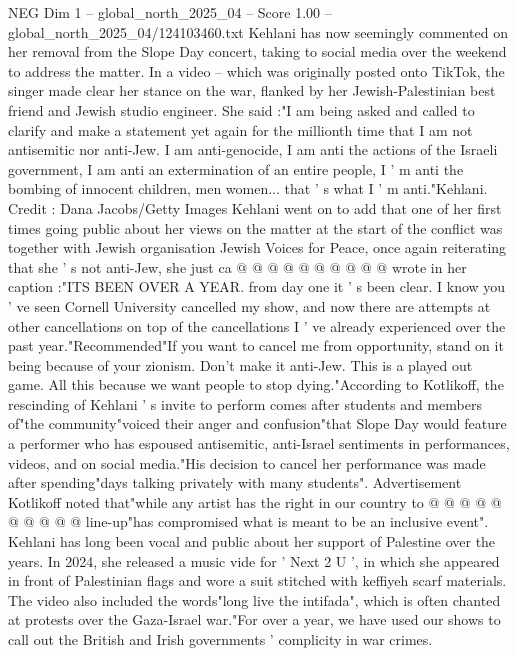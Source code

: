 \begin{textsample}{NEG Dim 1 – global\_north\_2025\_04 – Score 1.00 – global\_north\_2025\_04/124103460.txt}  \label{ex:f1_neg_108}
Kehlani has now seemingly commented on her removal from the Slope Day concert, taking to social media over the weekend to address the matter.
In a video -- which was originally posted onto TikTok, the singer made clear her stance on the war, flanked by her Jewish-Palestinian best friend and Jewish studio engineer.
She said :"I am being asked and called to clarify and make a statement yet again for the millionth time that I am not antisemitic nor anti-Jew.
I am anti-genocide, I am anti the actions of the Israeli government, I am anti an extermination of an entire people, I ' m anti the bombing of innocent children, men women... that ' s what I ' m anti."Kehlani.
Credit : Dana Jacobs/Getty Images Kehlani went on to add that one of her first times going public about her views on the matter at the start of the conflict was together with Jewish organisation Jewish Voices for Peace, once again reiterating that she ' s not anti-Jew, she just ca @ @ @ @ @ @ @ @ @ @ wrote in her caption :"ITS BEEN OVER A YEAR. from day one it ' s been clear.
I know you ' ve seen Cornell University cancelled my show, and now there are attempts at other cancellations on top of the cancellations I ' ve already experienced over the past year."Recommended"If you want to cancel me from opportunity, stand on it being because of your zionism.
Don't make it anti-Jew.
This is a played out game.
All this because we want people to stop dying."According to Kotlikoff, the rescinding of Kehlani ' s invite to perform comes after students and members of"the community"voiced their anger and confusion"that Slope Day would feature a performer who has espoused antisemitic, anti-Israel sentiments in performances, videos, and on social media."His decision to cancel her performance was made after spending"days talking privately with many students".
Advertisement Kotlikoff noted that"while any artist has the right in our country to @ @ @ @ @ @ @ @ @ @ line-up"has compromised what is meant to be an inclusive event".
Kehlani has long been vocal and public about her support of Palestine over the years.
In 2024, she released a music vide for ' Next 2 U ', in which she appeared in front of Palestinian flags and wore a suit stitched with keffiyeh scarf materials.
The video also included the words"long live the intifada", which is often chanted at protests over the Gaza-Israel war."For over a year, we have used our shows to call out the British and Irish governments ' complicity in war crimes.

\end{textsample}
